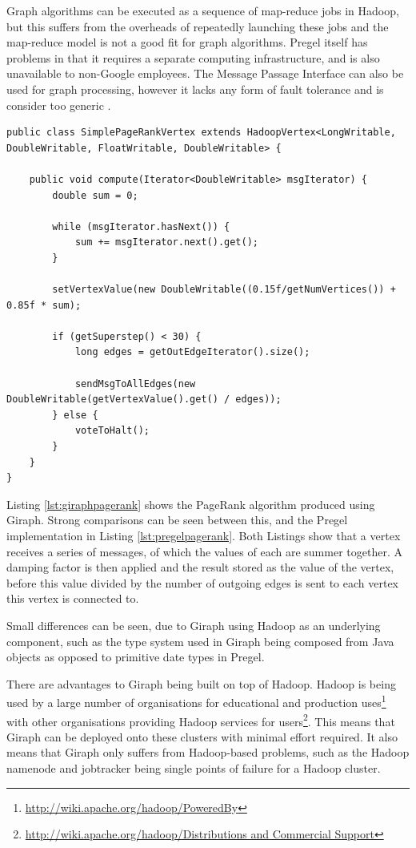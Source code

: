 Graph algorithms can be executed as a sequence of map-reduce jobs in Hadoop, but this suffers from the overheads of repeatedly launching these jobs and the map-reduce model is not a good fit for graph algorithms. Pregel itself has problems in that it requires a separate computing infrastructure, and is also unavailable to non-Google employees. The Message Passage Interface can also be used for graph processing, however it lacks any form of fault tolerance and is consider too generic \cite{giraphtalk}.

\begin{lstlisting}[float]
public class SimplePageRankVertex extends HadoopVertex<LongWritable, DoubleWritable, FloatWritable, DoubleWritable> {

	public void compute(Iterator<DoubleWritable> msgIterator) {
		double sum = 0;
		
		while (msgIterator.hasNext()) {
			sum += msgIterator.next().get();
		}
		
		setVertexValue(new DoubleWritable((0.15f/getNumVertices()) + 0.85f * sum);
		
		if (getSuperstep() < 30) {
			long edges = getOutEdgeIterator().size();
			
			sendMsgToAllEdges(new DoubleWritable(getVertexValue().get() / edges));
		} else {
			voteToHalt();
		}
	}
}					
\end{lstlisting}

Listing \ref{lst:giraphpagerank} shows the PageRank algorithm \cite{pagerank} produced using Giraph. Strong comparisons can be seen between this, and the Pregel implementation in Listing \ref{lst:pregelpagerank}. Both Listings show that a vertex receives a series of messages, of which the values of each are summer together. A damping factor is then applied and the result stored as the value of the vertex, before this value divided by the number of outgoing edges is sent to each vertex this vertex is connected to.

Small differences can be seen, due to Giraph using Hadoop as an underlying component, such as the type system used in Giraph being composed from Java objects as opposed to primitive date types in Pregel.

There are advantages to Giraph being built on top of Hadoop. Hadoop is being used by a large number of organisations for educational and production uses\footnote{\url{http://wiki.apache.org/hadoop/PoweredBy}} with other organisations providing Hadoop services for users\footnote{\url{http://wiki.apache.org/hadoop/Distributions and Commercial Support}}. This means that Giraph can be deployed onto these clusters with minimal effort required. It also means that Giraph only suffers from Hadoop-based problems, such as the Hadoop namenode and jobtracker being single points of failure for a Hadoop cluster.

